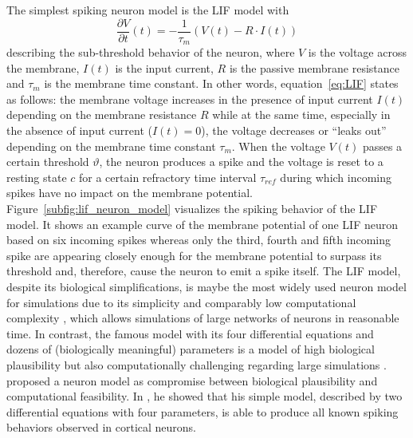 The simplest spiking neuron model is the \acf{LIF} model with
\begin{equation}
\frac{\partial V}{\partial t}(t) = - \frac{1}{\tau_{m}} \left( V\left(t\right) - R \cdot I\left(t\right) \right)
\label{eq:LIF}
\end{equation}
describing the sub-threshold behavior of the neuron, where $V$ is the voltage across the membrane, $I(t)$ is the input current, $R$ is the passive membrane resistance and $\tau_{m}$ is the membrane time constant.
In other words, equation~\eqref{eq:LIF} states as follows: the membrane voltage increases in the presence of input current $I(t)$ depending on the membrane resistance $R$ while at the same time, especially in the absence of input current ($I(t)=0$), the voltage decreases or \enquote{leaks out} depending on the membrane time constant $\tau_{m}$.
When the voltage $V(t)$ passes a certain threshold $\vartheta$, the neuron produces a spike and the voltage is reset to a resting state $c$ for a certain refractory time interval $\tau_{ref}$ during which incoming spikes have no impact on the membrane potential.
Figure~\ref{subfig:lif_neuron_model} visualizes the spiking behavior of the \ac{LIF} model.
It shows an example curve of the membrane potential of one \ac{LIF} neuron based on six incoming spikes whereas only the third, fourth and fifth incoming spike are appearing closely enough for the membrane potential to surpass its threshold and, therefore, cause the neuron to emit a spike itself.
The \ac{LIF} model, despite its biological simplifications, is maybe the most widely used neuron model for simulations due to its simplicity and comparably low computational complexity \parencite{Izhikevich2004}, which allows simulations of large networks of neurons in reasonable time.
In contrast, the famous \textcite{Hodgkin1952} model with its four differential equations and dozens of (biologically meaningful) parameters is a model of high biological plausibility but also computationally challenging regarding large simulations \parencite{Izhikevich2004}.
\textcite{Izhikevich2003} proposed a neuron model as compromise between biological plausibility and computational feasibility.
In \textcite{Izhikevich2004}, he showed that his simple model, described by two differential equations with four parameters, is able to produce all known spiking behaviors observed in cortical neurons. 

